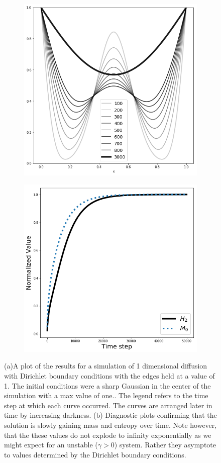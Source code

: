 \documentclass[]{article}
\begin{document}
\begin{figure}
	\begin{subfigure}{.5\textwidth}
		\centering
		\includegraphics[width=.8\linewidth]{figures/1D_diffusion.png}
		\caption{}
	\end{subfigure}%
	\begin{subfigure}{.5\textwidth}
		\centering
		\includegraphics[width=.8\linewidth]{figures/1D_diffusion_diag.png}
		\caption{}
	\end{subfigure}
	\caption{(a)A plot of the results for a simulation of 1 dimensional diffusion with Dirichlet boundary conditions with the edges held at a value of 1. The initial conditions were a sharp Gaussian in the center of the simulation with a max value of one.. The legend refers to the time step at which each curve occurred. The curves are arranged later in time by increasing darkness. (b) Diagnostic plots confirming that the solution is slowly gaining mass and entropy over time. Note however, that the these values do not explode to infinity exponentially as we might expect for an unstable ($\gamma>0$) system. Rather they asymptote to values determined by the Dirichlet boundary conditions.}
	\label{fig:1D_diffu_diri1}
\end{figure}
\end{document}
